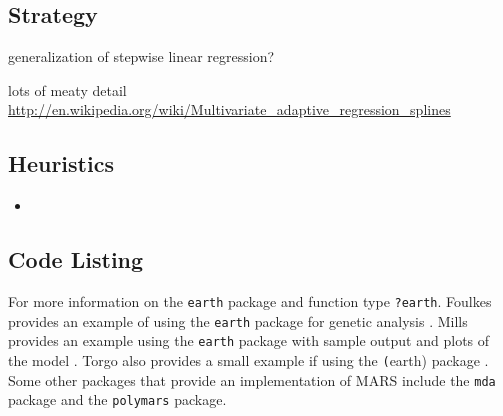\subsection{Strategy}

generalization of stepwise linear regression?

lots of meaty detail \url{http://en.wikipedia.org/wiki/Multivariate_adaptive_regression_splines}

\subsection{Heuristics}

\begin{itemize}
	\item 
\end{itemize}

\subsection{Code Listing}


For more information on the \texttt{earth} package and function type \texttt{?earth}. Foulkes provides an example of using the \texttt{earth} package for genetic analysis \cite{Foulkes2009}. Mills provides an example using the \texttt{earth} package with sample output and plots of the model \cite{Mills2010}. Torgo also provides a small example if using the \texttt(earth) package \cite{Torgo2009}. 
Some other packages that provide an implementation of MARS include the \texttt{mda} package and the \texttt{polymars} package.


